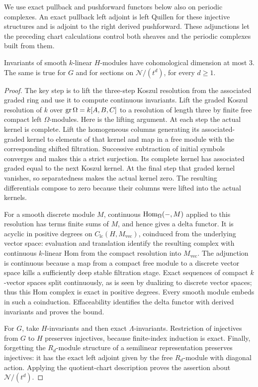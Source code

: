 We use exact pullback and pushforward functors below also on periodic
complexes.  An exact pullback left adjoint is left Quillen for these
injective structures and is adjoint to the right derived pushforward.
These adjunctions let the preceding chart calculations control both
sheaves and the periodic complexes built from them.

\begin{lemma}
Invariants\label{geom:group-cohomology} of smooth $k$-linear $H$-modules have cohomological
dimension at most $3$.  The same is true for $G$ and for sections
on $\mathcal N/(t^d)$, for every $d\geq1$.
\end{lemma}

\begin{proof}
The key step is to lift the three-step Koszul resolution from the
associated graded ring and use it to compute continuous invariants.
Lift the graded Koszul resolution of $k$ over
$\operatorname{gr}\Omega=k[A,B,C]$ to a resolution of length three by finite free
compact left $\Omega$-modules.  Here is the lifting argument.  At
each step the actual kernel is complete.  Lift the homogeneous
columns generating its associated-graded kernel to elements of that
kernel and map in a free module with the corresponding shifted
filtration.  Successive subtraction of initial symbols converges
and makes this a strict surjection.  Its complete kernel has
associated graded equal to the next Koszul kernel.  At the final
step that graded kernel vanishes, so separatedness makes the actual
kernel zero.  The resulting differentials compose to zero because
their columns were lifted into the actual kernels.

For a smooth discrete module $M$, continuous
$\operatorname{Hom}_\Omega(-,M)$ applied to this resolution has terms finite sums
of $M$, and hence gives a delta functor.  It is acyclic in positive
degrees on $C_{\mathrm{lc}}(H,M_{\mathrm{vec}})$, coinduced from the
underlying vector space: evaluation and translation identify the
resulting complex with continuous $k$-linear Hom from the compact
resolution into $M_{\mathrm{vec}}$.  The adjunction is continuous
because a map from a compact free module to a discrete vector space
kills a sufficiently deep stable filtration stage.  Exact sequences
of compact $k$-vector spaces split continuously, as is seen by
dualizing to discrete vector spaces; thus this Hom complex is exact
in positive degrees.  Every smooth module embeds in such a
coinduction.  Effaceability identifies the delta functor with derived
invariants and proves the bound.

For $G$, take $H$-invariants and then exact $\Lambda$-invariants.
Restriction of injectives from $G$ to $H$ preserves injectives,
because finite-index induction is exact.  Finally, forgetting the
$R_d$-module structure of a semilinear representation preserves
injectives: it has the exact left adjoint given by the free
$R_d$-module with diagonal action.  Applying the quotient-chart
description proves the assertion about $\mathcal N/(t^d)$.
\end{proof}

